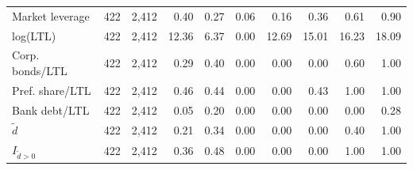 \begin{threeparttable}
\begin{tabular}{lrrrrrrrrr}
Market leverage & 422 & 2,412 & 0.40 & 0.27 & 0.06 & 0.16 & 0.36 & 0.61 & 0.90 \\
log(LTL) & 422 & 2,412 & 12.36 & 6.37 & 0.00 & 12.69 & 15.01 & 16.23 & 18.09 \\
Corp. bonds/LTL & 422 & 2,412 & 0.29 & 0.40 & 0.00 & 0.00 & 0.00 & 0.60 & 1.00 \\
Pref. share/LTL & 422 & 2,412 & 0.46 & 0.44 & 0.00 & 0.00 & 0.43 & 1.00 & 1.00 \\
Bank debt/LTL & 422 & 2,412 & 0.05 & 0.20 & 0.00 & 0.00 & 0.00 & 0.00 & 0.28 \\
\ensuremath{\tilde{d}} & 422 & 2,412 & 0.21 & 0.34 & 0.00 & 0.00 & 0.00 & 0.40 & 1.00 \\
\ensuremath{I_{\tilde{d}>0}} & 422 & 2,412 & 0.36 & 0.48 & 0.00 & 0.00 & 0.00 & 1.00 & 1.00 \\
\bottomrule\end{tabular}\end{threeparttable}
